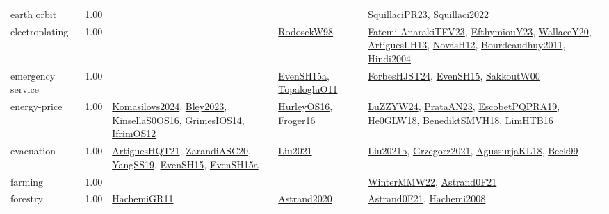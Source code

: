 {\begin{longtable}{p{3cm}r>{\raggedright\arraybackslash}p{6cm}>{\raggedright\arraybackslash}p{6cm}>{\raggedright\arraybackslash}p{8cm}}
\index{earth orbit}\index{ApplicationAreas!earth orbit}earth orbit &  1.00 &  &  & \hyperref[detail:SquillaciPR23]{SquillaciPR23}, \hyperref[detail:Squillaci2022]{Squillaci2022}\\
\index{electroplating}\index{ApplicationAreas!electroplating}electroplating &  1.00 &  & \hyperref[detail:RodosekW98]{RodosekW98} & \hyperref[detail:Fatemi-AnarakiTFV23]{Fatemi-AnarakiTFV23}, \hyperref[detail:EfthymiouY23]{EfthymiouY23}, \hyperref[detail:WallaceY20]{WallaceY20}, \hyperref[detail:ArtiguesLH13]{ArtiguesLH13}, \hyperref[detail:NovasH12]{NovasH12}, \hyperref[detail:Bourdeaudhuy2011]{Bourdeaudhuy2011}, \hyperref[detail:Hindi2004]{Hindi2004}\\
\index{emergency service}\index{ApplicationAreas!emergency service}emergency service &  1.00 &  & \hyperref[detail:EvenSH15a]{EvenSH15a}, \hyperref[detail:TopalogluO11]{TopalogluO11} & \hyperref[detail:ForbesHJST24]{ForbesHJST24}, \hyperref[detail:EvenSH15]{EvenSH15}, \hyperref[detail:SakkoutW00]{SakkoutW00}\\
\index{energy-price}\index{ApplicationAreas!energy-price}energy-price &  1.00 & \hyperref[detail:Komasilovs2024]{Komasilovs2024}, \hyperref[detail:Bley2023]{Bley2023}, \hyperref[detail:KinsellaS0OS16]{KinsellaS0OS16}, \hyperref[detail:GrimesIOS14]{GrimesIOS14}, \hyperref[detail:IfrimOS12]{IfrimOS12} & \hyperref[detail:HurleyOS16]{HurleyOS16}, \hyperref[detail:Froger16]{Froger16} & \hyperref[detail:LuZZYW24]{LuZZYW24}, \hyperref[detail:PrataAN23]{PrataAN23}, \hyperref[detail:EscobetPQPRA19]{EscobetPQPRA19}, \hyperref[detail:He0GLW18]{He0GLW18}, \hyperref[detail:BenediktSMVH18]{BenediktSMVH18}, \hyperref[detail:LimHTB16]{LimHTB16}\\
\index{evacuation}\index{ApplicationAreas!evacuation}evacuation &  1.00 & \hyperref[detail:ArtiguesHQT21]{ArtiguesHQT21}, \hyperref[detail:ZarandiASC20]{ZarandiASC20}, \hyperref[detail:YangSS19]{YangSS19}, \hyperref[detail:EvenSH15]{EvenSH15}, \hyperref[detail:EvenSH15a]{EvenSH15a} & \hyperref[detail:Liu2021]{Liu2021} & \hyperref[detail:Liu2021b]{Liu2021b}, \hyperref[detail:Grzegorz2021]{Grzegorz2021}, \hyperref[detail:AgussurjaKL18]{AgussurjaKL18}, \hyperref[detail:Beck99]{Beck99}\\
\index{farming}\index{ApplicationAreas!farming}farming &  1.00 &  &  & \hyperref[detail:WinterMMW22]{WinterMMW22}, \hyperref[detail:Astrand0F21]{Astrand0F21}\\
\index{forestry}\index{ApplicationAreas!forestry}forestry &  1.00 & \hyperref[detail:HachemiGR11]{HachemiGR11} & \hyperref[detail:Astrand2020]{Astrand2020} & \hyperref[detail:Astrand0F21]{Astrand0F21}, \hyperref[detail:Hachemi2008]{Hachemi2008}\\

\end{longtable}}
